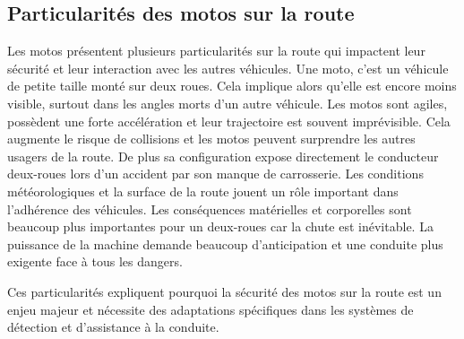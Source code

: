 \documentclass{article}
\begin{document}
\subsection{Particularités des motos sur la route}
Les motos présentent plusieurs particularités sur la route qui impactent leur sécurité et leur interaction avec les autres véhicules.
Une moto, c'est un véhicule de petite taille monté sur deux roues. Cela implique alors qu'elle est encore moins visible, surtout dans les angles morts d'un autre véhicule. Les motos sont agiles, possèdent une forte accélération et leur trajectoire est souvent imprévisible. Cela augmente le risque de collisions et les motos peuvent surprendre les autres usagers de la route. De plus sa configuration expose directement le conducteur deux-roues lors d'un accident par son manque de carrosserie. Les conditions météorologiques et la surface de la route jouent un rôle important dans l'adhérence des véhicules. Les conséquences matérielles et corporelles sont beaucoup plus importantes pour un deux-roues car la chute est inévitable.
La puissance de la machine demande beaucoup d'anticipation et une conduite plus exigente face à tous les dangers.

\vspace{0.5cm} %
Ces particularités expliquent pourquoi la sécurité des motos sur la route est un enjeu majeur et nécessite des adaptations spécifiques dans les systèmes de détection et d’assistance à la conduite. 
\end{document}
